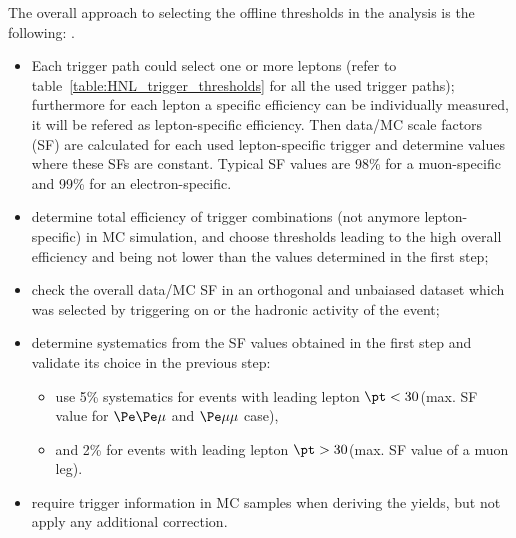 The overall approach to selecting the offline thresholds in the analysis is the following:
.


\begin{itemize}
\setlength\itemsep{-0.1em}
\item Each trigger path could select one or more leptons (refer to
  table~\ref{table:HNL_trigger_thresholds} for all the used trigger paths); furthermore for
  each lepton a specific efficiency can be individually measured, it
  will be refered as lepton-specific efficiency. Then data/MC scale
  factors (SF) are calculated for each used
  lepton-specific trigger and determine values where these SFs are
  constant. 
 Typical SF values are 98\% for a muon-specific and 99\% for an electron-specific. 
\item determine total efficiency of trigger combinations (not anymore
  lepton-specific) in MC simulation, and choose \pt thresholds leading to the high overall efficiency and being not lower than the values determined in the first step;
\item check the overall data/MC SF in an orthogonal and unbaiased dataset which was
  selected by triggering on \ptmiss or the hadronic activity of the event;
\item determine systematics from the SF values obtained in the first step and validate its choice in the previous step: 
\begin{itemize}
\item use 5\% systematics for events with leading lepton $\pt < 30$\GeV (max. SF value for $\Pe\Pe\mu$ and $\Pe\mu\mu$ case),
\item and 2\% for events with leading lepton $\pt > 30$\GeV (max. SF value of a muon leg).
\end{itemize}
\item require trigger information in MC samples when deriving the yields, but not apply any additional correction.
\end{itemize}


